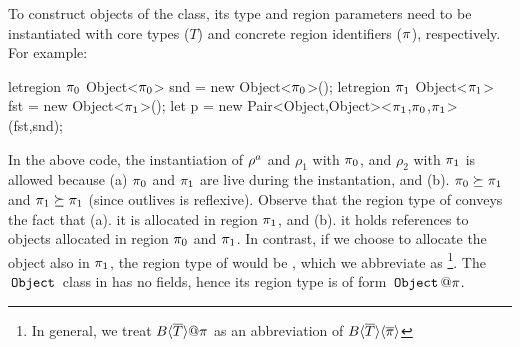 To construct objects of the  class, its type and region
parameters need to be instantiated with core types ($T$) and concrete
region identifiers ($\pi$), respectively. For example:
\begin{codejava}
letregion $\pi_0$ {
  Object<$\pi_0$> snd = new Object<$\pi_0$>();
  letregion $\pi_1$ {
    Object<$\pi_1$> fst = new Object<$\pi_1$>();
    let p = new Pair<Object,Object><$\pi_1$,$\pi_0$,$\pi_1$>
                  (fst,snd);
  }
}
\end{codejava}
In the above code, the instantiation of $\rho^a$ and $\rho_1$ with
$\pi_0$, and $\rho_2$ with $\pi_1$ is allowed because (a) $\pi_0$
and $\pi_1$ are live during the instantation, and (b). $\pi_0
\succeq \pi_1$ and $\pi_1 \succeq \pi_1$ (since outlives is
reflexive). Observe that the region type of  conveys
the fact that (a). it is allocated in region $\pi_1$, and (b). it
holds references to objects allocated in region $\pi_0$ and $\pi_1$.
In contrast, if we choose to allocate the  object also in
$\pi_1$, the region type of  would be
, which we abbreviate
as \footnote{In general, we treat
$B\inang{\tbar}@\rgn$ as an abbreviation of
$B\langle \overline{T} \rangle\langle \overline{\pi} \rangle$}. The $\,{\tt Object}\,$ class in \FB has no
fields, hence its region type is of form $\ObjZ@\rgn$.


